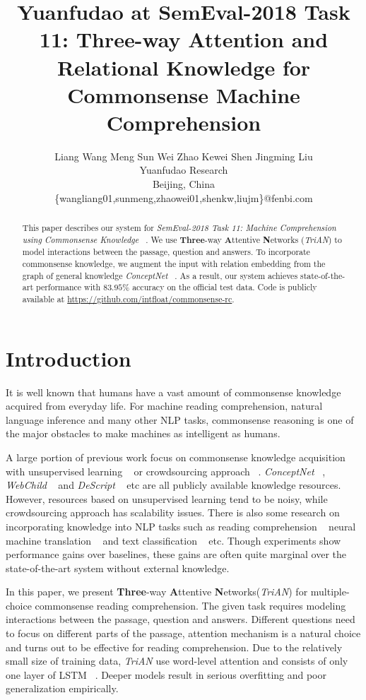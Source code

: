 \documentclass[11pt,a4paper]{article}
\title{Yuanfudao at SemEval-2018 Task 11: Three-way Attention and Relational Knowledge for Commonsense Machine Comprehension}
\author{Liang Wang \qquad Meng Sun \qquad Wei Zhao \qquad Kewei Shen \qquad Jingming Liu \\
    Yuanfudao Research \\
    Beijing, China \\
    \{wangliang01,sunmeng,zhaowei01,shenkw,liujm\}@fenbi.com\\}
\date{}
\begin{document}
\maketitle
\begin{abstract}
This paper describes our system for
\emph{SemEval-2018 Task 11: Machine Comprehension using Commonsense Knowledge} ~\cite{SemEval2018Task11}.
We use \textbf{Three}-way \textbf{A}ttentive \textbf{N}etworks (\emph{TriAN})
to model interactions between the passage, question and answers.
To incorporate commonsense knowledge,
we augment the input with relation embedding
from the graph of general knowledge \emph{ConceptNet} ~\cite{speer2017conceptnet}.
As a result,
our system achieves state-of-the-art performance with $83.95\%$ accuracy on the official test data.
Code is publicly available at \url{https://github.com/intfloat/commonsense-rc}.
\end{abstract}

\section{Introduction}

It is well known that humans have a vast amount of commonsense knowledge acquired from everyday life.
For machine reading comprehension,
natural language inference and many other NLP tasks,
commonsense reasoning is one of the major obstacles to make machines as intelligent as humans.

A large portion of previous work focus on commonsense knowledge acquisition
with unsupervised learning ~\cite{chambers2008unsupervised,tandon2017webchild}
or crowdsourcing approach ~\cite{singh2002open,wanzare2016descript}.
\emph{ConceptNet} ~\cite{speer2017conceptnet}, \emph{WebChild} ~\cite{tandon2017webchild}
and \emph{DeScript} ~\cite{wanzare2016descript} etc are all publicly available knowledge resources.
However,
resources based on unsupervised learning tend to be noisy,
while crowdsourcing approach has scalability issues.
There is also some research on incorporating knowledge into NLP tasks
such as reading comprehension ~\cite{lin2017reasoning,yang2017leveraging}
neural machine translation ~\cite{zhang2017prior} and text classification ~\cite{zhang2017exploiting} etc.
Though experiments show performance gains over baselines,
these gains are often quite marginal over the state-of-the-art system without external knowledge.

In this paper,
we present \textbf{Three}-way \textbf{A}ttentive \textbf{N}etworks(\emph{TriAN})
for multiple-choice commonsense reading comprehension.
The given task requires modeling interactions between the passage,
question and answers.
Different questions need to focus on different parts of the passage,
attention mechanism is a natural choice
and turns out to be effective for reading comprehension.
Due to the relatively small size of training data,
\emph{TriAN} use word-level attention
and consists of only one layer of LSTM ~\cite{hochreiter1997long}.
Deeper models result in serious overfitting and poor generalization empirically.
\end{document}
